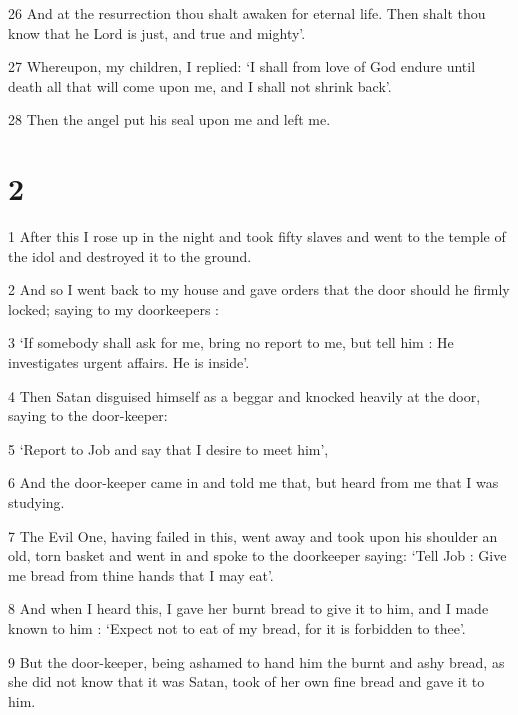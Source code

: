 \par 26 And at the resurrection thou shalt awaken for eternal life. Then shalt thou know that he Lord is just, and true and mighty’.

\par 27 Whereupon, my children, I replied: ‘I shall from love of God endure until death all that will come upon me, and I shall not shrink back’.

\par 28 Then the angel put his seal upon me and left me.

\chapter{2}

\par 1 After this I rose up in the night and took fifty slaves and went to the temple of the idol and destroyed it to the ground. 

\par 2 And so I went back to my house and gave orders that the door should he firmly locked; saying to my doorkeepers :

\par 3 ‘If somebody shall ask for me, bring no report to me, but tell him : He investigates urgent affairs. He is inside’.

\par 4 Then Satan disguised himself as a beggar and knocked heavily at the door, saying to the door-keeper:

\par 5 ‘Report to Job and say that I desire to meet him’,

\par 6 And the door-keeper came in and told me that, but heard from me that I was studying.

\par 7 The Evil One, having failed in this, went away and took upon his shoulder an old, torn basket and went in and spoke to the doorkeeper saying: ‘Tell Job : Give me bread from thine hands that I may eat’.

\par 8 And when I heard this, I gave her burnt bread to give it to him, and I made known to him : ‘Expect not to eat of my bread, for it is forbidden to thee’.

\par 9 But the door-keeper, being ashamed to hand him the burnt and ashy bread, as she did not know that it was Satan, took of her own fine bread and gave it to him.


